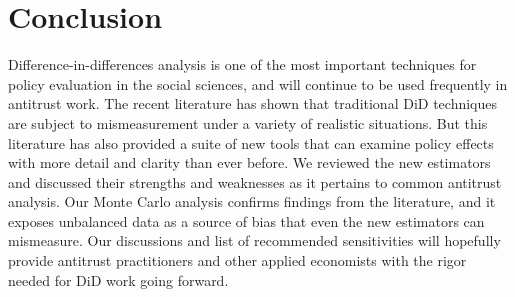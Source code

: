 \documentclass[12pt]{article}
\begin{document}
\section{Conclusion} \label{sec:conclusion}
\singlespace
Difference-in-differences analysis is one of the most important techniques for policy evaluation in the social sciences, and will continue to be used frequently in antitrust work. The recent literature has shown that traditional DiD techniques are subject to mismeasurement under a variety of realistic situations. But this literature has also provided a suite of new tools that can examine policy effects with more detail and clarity than ever before. We reviewed the new estimators and discussed their strengths and weaknesses as it pertains to common antitrust analysis. Our Monte Carlo analysis confirms findings from the literature, and it exposes unbalanced data as a source of bias that even the new estimators can mismeasure. Our discussions and list of recommended sensitivities will hopefully provide antitrust practitioners and other applied economists with the rigor needed for DiD work going forward.

\newpage
\doublespace
\printbibliography
{}

\newpage
\end{document}
